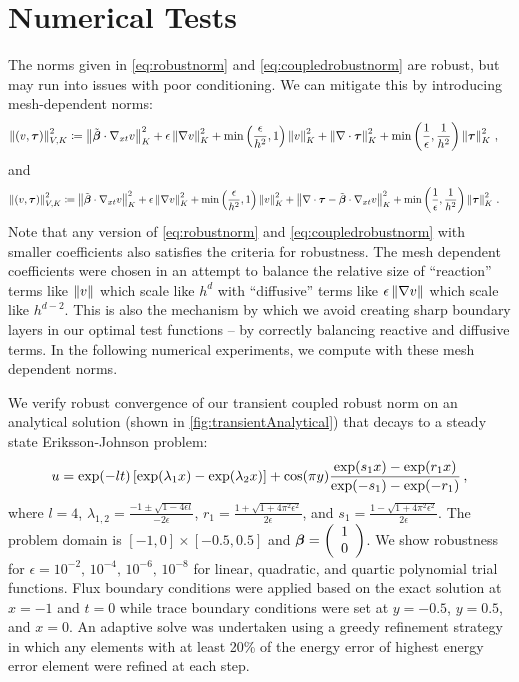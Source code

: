 \documentclass{article}
\begin{document}
\section{Numerical Tests}
The norms given in \eqref{eq:robustnorm} and \eqref{eq:coupledrobustnorm} are robust, but may run into issues with poor conditioning.
We can mitigate this by introducing mesh-dependent norms:
\begin{align}
\label{eq:meshrobustnorm}
\left\| \left( v,\boldsymbol\tau \right) \right\|_{V,K}^2 &\coloneqq
\left\| \tilde{\boldsymbol\beta}\cdot\nabla_{xt} v \right\|_K^2
+ \epsilon\left\| \nabla v \right\|_K^2
+ \min\left( \frac{\epsilon}{h^2},1 \right)\left\| v \right\|^2_K
+ \left\| \nabla\cdot \boldsymbol\tau \right\|_K^2
+ \min\left( \frac{1}{\epsilon},\frac{1}{h^2} \right)\left\| \boldsymbol\tau \right\|_K^2\,,
\end{align}
and
\begin{align}
\label{eq:meshcoupledrobustnorm}
\left\| \left( v,\boldsymbol\tau \right) \right\|_{V,K}^2 &\coloneqq
\left\| \tilde{\boldsymbol\beta}\cdot\nabla_{xt} v \right\|_K^2
+ \epsilon\left\| \nabla v \right\|_K^2
+ \min\left( \frac{\epsilon}{h^2},1 \right)\left\| v \right\|^2_K
+ \left\| \nabla\cdot \boldsymbol\tau - \tilde{\boldsymbol\beta}\cdot\nabla_{xt} v \right\|_K^2
+ \min\left( \frac{1}{\epsilon},\frac{1}{h^2} \right)\left\| \boldsymbol\tau \right\|_K^2\,.
\end{align}
Note that any version of \eqref{eq:robustnorm} and \eqref{eq:coupledrobustnorm} with smaller coefficients also satisfies the criteria for robustness.
The mesh dependent coefficients were chosen in an attempt to balance the relative size of ``reaction'' terms like $\left\| v \right\|$ which scale like $h^{d}$
with ``diffusive'' terms like $\epsilon\left\| \nabla v \right\|$ which scale like $h^{d-2}$.
This is also the mechanism by which we avoid creating sharp boundary layers in our optimal test functions -- by correctly balancing reactive and diffusive terms.
In the following numerical experiments, we compute with these mesh dependent norms.

We verify robust convergence of our transient coupled robust norm on an analytical solution (shown in \ref{fig:transientAnalytical}) that decays to a steady state Eriksson-Johnson problem:
\[
u=\exp(-lt)\left[ \exp(\lambda_1 x)-\exp(\lambda_2 x) \right]+
\cos(\pi y)\frac{\exp(s_1x)-\exp(r_1x)}{\exp(-s_1)-\exp(-r_1)}\,,
\]
where $l=4$,
$\lambda_{1,2}=\frac{-1\pm\sqrt{1-4\epsilon l}}{-2\epsilon}$,
$r_1=\frac{1+\sqrt{1+4\pi^2\epsilon^2}}{2\epsilon}$, and
$s_1=\frac{1-\sqrt{1+4\pi^2\epsilon^2}}{2\epsilon}$.
The problem domain is $[-1,0]\times[-0.5,0.5]$ and $\boldsymbol\beta=\left( \begin{array}{c} 1\\ 0\\ \end{array} \right)$.
We show robustness for $\epsilon=10^{-2},\,10^{-4},\,10^{-6},\,10^{-8}$ for linear, quadratic, and quartic polynomial trial functions.
Flux boundary conditions were applied based on the exact solution at $x=-1$ and $t=0$ 
while trace boundary conditions were set at $y=-0.5$, $y=0.5$, and $x=0$.
An adaptive solve was undertaken using a greedy refinement strategy in which any elements with at least 20\% of the energy error 
of highest energy error element were refined at each step.
\end{document}
